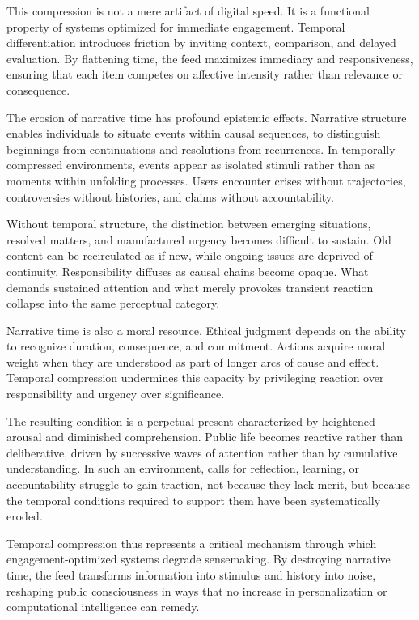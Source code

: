 \documentclass[12pt]{article}
\begin{document}
This compression is not a mere artifact of digital speed. It is a functional property of systems optimized for immediate engagement. Temporal differentiation introduces friction by inviting context, comparison, and delayed evaluation. By flattening time, the feed maximizes immediacy and responsiveness, ensuring that each item competes on affective intensity rather than relevance or consequence.

The erosion of narrative time has profound epistemic effects. Narrative structure enables individuals to situate events within causal sequences, to distinguish beginnings from continuations and resolutions from recurrences. In temporally compressed environments, events appear as isolated stimuli rather than as moments within unfolding processes. Users encounter crises without trajectories, controversies without histories, and claims without accountability.

Without temporal structure, the distinction between emerging situations, resolved matters, and manufactured urgency becomes difficult to sustain. Old content can be recirculated as if new, while ongoing issues are deprived of continuity. Responsibility diffuses as causal chains become opaque. What demands sustained attention and what merely provokes transient reaction collapse into the same perceptual category.

Narrative time is also a moral resource. Ethical judgment depends on the ability to recognize duration, consequence, and commitment. Actions acquire moral weight when they are understood as part of longer arcs of cause and effect. Temporal compression undermines this capacity by privileging reaction over responsibility and urgency over significance.

The resulting condition is a perpetual present characterized by heightened arousal and diminished comprehension. Public life becomes reactive rather than deliberative, driven by successive waves of attention rather than by cumulative understanding. In such an environment, calls for reflection, learning, or accountability struggle to gain traction, not because they lack merit, but because the temporal conditions required to support them have been systematically eroded.

Temporal compression thus represents a critical mechanism through which engagement-optimized systems degrade sensemaking. By destroying narrative time, the feed transforms information into stimulus and history into noise, reshaping public consciousness in ways that no increase in personalization or computational intelligence can remedy.
\end{document}
